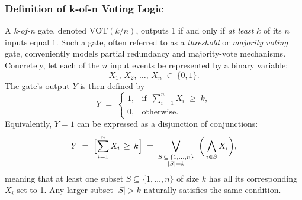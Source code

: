 \subsubsection{Definition of k-of-n Voting Logic}
\label{sec:kn_voting_logic_definition}

A \emph{k-of-n} gate, denoted \(\mathrm{VOT}(k/n)\), outputs 1 if and only if \emph{at least} \(k\) of its \(n\) inputs equal 1. Such a gate, often referred to as a \emph{threshold} or \emph{majority voting} gate, conveniently models partial redundancy and majority-vote mechanisms. Concretely, let each of the \(n\) input events be represented by a binary variable:
\[
X_1, \, X_2, \, \dots, \, X_n \;\in\;\{0,1\}.
\]
The gate's output \(Y\) is then defined by
\begin{equation}
\label{eq:kn_gate_boolean}
Y 
\;=\;
\begin{cases}
1, & \text{if }\, \displaystyle\sum_{i=1}^{n} X_i \;\ge\; k,\\[4pt]
0, & \text{otherwise}.
\end{cases}
\end{equation}
Equivalently, \(Y=1\) can be expressed as a disjunction of conjunctions:
\begin{equation}
\label{eq:k_of_n_or_of_ands}
Y 
\;=\;
\Bigl[\sum_{i=1}^{n} X_i \,\ge\, k\Bigr]
\;=\;
\bigvee_{\substack{S\,\subseteq\,\{1,\dots,n\}\\|S|=k}}
\;\;\biggl(\,\bigwedge_{i\in S} X_i\biggr),
\end{equation}
meaning that at least one subset \(S\subseteq \{1,\dots,n\}\) of size \(k\) has all its corresponding \(X_i\) set to 1. Any larger subset \(\lvert S\rvert > k\) naturally satisfies the same condition.

